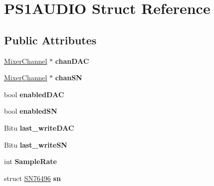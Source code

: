 \hypertarget{structPS1AUDIO}{\section{P\-S1\-A\-U\-D\-I\-O Struct Reference}
\label{structPS1AUDIO}
}
\subsection*{Public Attributes}
\begin{DoxyCompactItemize}
\item 
\hypertarget{structPS1AUDIO_a7287232a0cfd2c6891d053684ffae477}{\hyperlink{classMixerChannel}{Mixer\-Channel} $\ast$ {\bfseries chan\-D\-A\-C}}\label{structPS1AUDIO_a7287232a0cfd2c6891d053684ffae477}

\item 
\hypertarget{structPS1AUDIO_a396c28c237bd5862b0db07f43d81e980}{\hyperlink{classMixerChannel}{Mixer\-Channel} $\ast$ {\bfseries chan\-S\-N}}\label{structPS1AUDIO_a396c28c237bd5862b0db07f43d81e980}

\item 
\hypertarget{structPS1AUDIO_a520295e0b096d5645df68c07ec94315a}{bool {\bfseries enabled\-D\-A\-C}}\label{structPS1AUDIO_a520295e0b096d5645df68c07ec94315a}

\item 
\hypertarget{structPS1AUDIO_a7b0781147e241d9c9c76381bb5dc8401}{bool {\bfseries enabled\-S\-N}}\label{structPS1AUDIO_a7b0781147e241d9c9c76381bb5dc8401}

\item 
\hypertarget{structPS1AUDIO_af3993fa0a7c45e5d3368974fc64ef23a}{Bitu {\bfseries last\-\_\-write\-D\-A\-C}}\label{structPS1AUDIO_af3993fa0a7c45e5d3368974fc64ef23a}

\item 
\hypertarget{structPS1AUDIO_a3a5a96e25c3a5b41d019a11257746a5e}{Bitu {\bfseries last\-\_\-write\-S\-N}}\label{structPS1AUDIO_a3a5a96e25c3a5b41d019a11257746a5e}

\item 
\hypertarget{structPS1AUDIO_a877541fed8ba288473ec7abd62fdb667}{int {\bfseries Sample\-Rate}}\label{structPS1AUDIO_a877541fed8ba288473ec7abd62fdb667}

\item 
\hypertarget{structPS1AUDIO_ac05f6bf589c7191adfd76494a0f72258}{struct \hyperlink{structSN76496}{S\-N76496} {\bfseries sn}}\label{structPS1AUDIO_ac05f6bf589c7191adfd76494a0f72258}


\end{DoxyCompactItemize}

